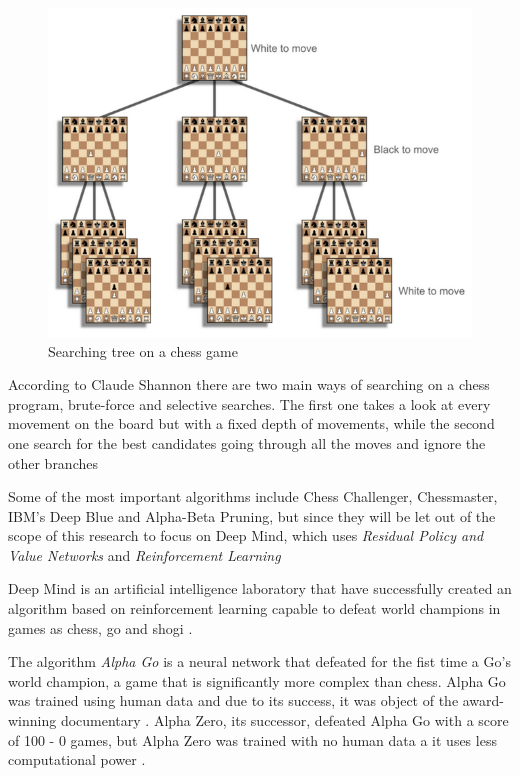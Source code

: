 \documentclass[conference]{IEEEtran}
\begin{document}
\begin{figure}[h]
\includegraphics[scale=0.52]{img/tree}
\caption{Searching tree on a chess game \cite{how}}
\label{chess:tree}
\end{figure}

According to Claude Shannon there are two main ways of searching on a chess program, brute-force and selective searches. The first one takes a look at every movement on the board but with a fixed depth of movements, while the second one search for the best candidates going through all the moves and ignore the other branches \cite{how}

Some of the most important algorithms include Chess Challenger, Chessmaster, IBM’s Deep Blue and Alpha-Beta Pruning, but since they will be let out of the scope of this research to focus on Deep Mind, which uses \textit{Residual Policy and Value Networks} and \textit{Reinforcement Learning}

Deep Mind is an artificial intelligence laboratory that have successfully created an algorithm based on reinforcement learning capable to defeat world champions in games as chess, go and shogi \cite{how}.

The algorithm \textit{Alpha Go} is a neural network that defeated for the fist time a Go's world champion, a game that is significantly more complex than chess. Alpha Go was trained using human data and due to its success, it was object of the award-winning documentary \cite{how}. Alpha Zero, its successor, defeated Alpha Go with a score of 100 - 0 games, but Alpha Zero was trained with no human data a it uses less computational power \cite{how}.
\end{document}
